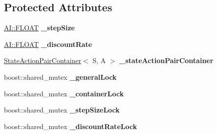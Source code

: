 \subsection*{Protected Attributes}
\begin{DoxyCompactItemize}
\item 
\hypertarget{classAI_1_1Algorithm_1_1ReinforcementLearning_ae8a4204e547054e55542e6f7de4b5dc1}{\hyperlink{namespaceAI_a41b74884a20833db653dded3918e05c3}{A\-I\-::\-F\-L\-O\-A\-T} {\bfseries \-\_\-step\-Size}}\label{classAI_1_1Algorithm_1_1ReinforcementLearning_ae8a4204e547054e55542e6f7de4b5dc1}

\item 
\hypertarget{classAI_1_1Algorithm_1_1ReinforcementLearning_af72ecd83332f502a73f9c5636f433de2}{\hyperlink{namespaceAI_a41b74884a20833db653dded3918e05c3}{A\-I\-::\-F\-L\-O\-A\-T} {\bfseries \-\_\-discount\-Rate}}\label{classAI_1_1Algorithm_1_1ReinforcementLearning_af72ecd83332f502a73f9c5636f433de2}

\item 
\hypertarget{classAI_1_1Algorithm_1_1ReinforcementLearning_aee3318af6590363309fdd04fb9eeebe5}{\hyperlink{classAI_1_1StateActionPairContainer}{State\-Action\-Pair\-Container}$<$ S, A $>$ {\bfseries \-\_\-state\-Action\-Pair\-Container}}\label{classAI_1_1Algorithm_1_1ReinforcementLearning_aee3318af6590363309fdd04fb9eeebe5}

\item 
\hypertarget{classAI_1_1Algorithm_1_1ReinforcementLearning_aa6cddd34af5d8565ea71796434dc17af}{boost\-::shared\-\_\-mutex {\bfseries \-\_\-general\-Lock}}\label{classAI_1_1Algorithm_1_1ReinforcementLearning_aa6cddd34af5d8565ea71796434dc17af}

\item 
\hypertarget{classAI_1_1Algorithm_1_1ReinforcementLearning_a365513e575cf60c0ae6fd5dfcfc54913}{boost\-::shared\-\_\-mutex {\bfseries \-\_\-container\-Lock}}\label{classAI_1_1Algorithm_1_1ReinforcementLearning_a365513e575cf60c0ae6fd5dfcfc54913}

\item 
\hypertarget{classAI_1_1Algorithm_1_1ReinforcementLearning_acc5503fcb31fb030be0c9d302517adcc}{boost\-::shared\-\_\-mutex {\bfseries \-\_\-step\-Size\-Lock}}\label{classAI_1_1Algorithm_1_1ReinforcementLearning_acc5503fcb31fb030be0c9d302517adcc}

\item 
\hypertarget{classAI_1_1Algorithm_1_1ReinforcementLearning_aaa369f14f7f9b9ddb0bf8efb2b8363dd}{boost\-::shared\-\_\-mutex {\bfseries \-\_\-discount\-Rate\-Lock}}\label{classAI_1_1Algorithm_1_1ReinforcementLearning_aaa369f14f7f9b9ddb0bf8efb2b8363dd}

\end{DoxyCompactItemize}
